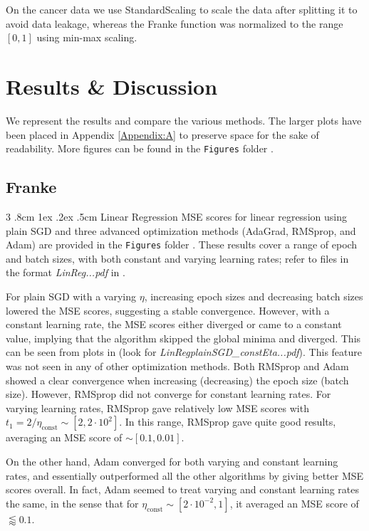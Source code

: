 \documentclass[%
reprint,s
amsmath,amssymb,
aps,
]{revtex4-2}
\makeatletter
\renewcommand{\subsubsection}{%
	\@startsection
	{subsubsection}%
	{3}%
	{\z@}%
	{.8cm \@plus1ex \@minus .2ex}%
	{.5cm}%
	{\normalfont\small\centering}%
}
\makeatother
\begin{document}
On the cancer data we use StandardScaling to scale the data after splitting it to avoid data leakage, whereas the Franke function was normalized to the range $[0,1]$ using min-max scaling.


\section{Results \& Discussion}
We represent the results and compare the various methods. The larger plots have been placed in Appendix \ref{Appendix:A} to preserve space for the sake of readability. More figures can be found in the \texttt{Figures} folder \cite{extrafigures}.

\subsection{Franke}
\subsubsection{Linear Regression}
MSE scores for linear regression using plain SGD and three advanced optimization methods (AdaGrad, RMSprop, and Adam) are provided in the \texttt{Figures} folder \cite{extrafigures}. These results cover a range of epoch and batch sizes, with both constant and varying learning rates; refer to files in the format \emph{LinReg...pdf} in \cite{extrafigures}. 

For plain SGD with a varying \(\eta\), increasing epoch sizes and decreasing batch sizes lowered the MSE scores, suggesting a stable convergence. However, with a constant learning rate, the MSE scores either diverged or came to a constant value, implying that the algorithm skipped the global minima and diverged. This can be seen from plots in \cite{extrafigures} (look for \emph{LinRegplainSGD\_constEta...pdf}). This feature was not seen in any of other optimization methods. Both RMSprop and Adam showed a clear convergence when increasing (decreasing) the epoch size (batch size). However, RMSprop did not converge for constant learning rates. For varying learning rates, RMSprop gave relatively low MSE scores with \(t_{1} = 2/\eta_{\text{const}}\sim [2, 2\cdot 10^{2}]\). In this range, RMSprop gave quite good results, averaging an MSE score of \(\sim [0.1, 0.01]\). 

On the other hand, Adam converged for both varying and constant learning rates, and essentially outperformed all the other algorithms by giving better MSE scores overall. In fact, Adam seemed to treat varying and constant learning rates the same, in the sense that for \(\eta_{\text{const}}\sim[2\cdot10^{-2}, 1]\), it averaged an MSE score of \(\lessapprox 0.1\).
\end{document}
